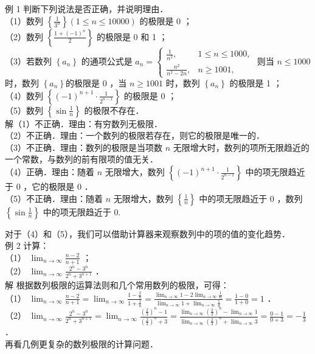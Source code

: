 \documentclass[10pt]{article}
\begin{document}
例 1 判断下列说法是否正确，并说明理由．\\
（1）数列 \(\left\{\frac{1}{3^{n}}\right\}(1 \leqslant n \leqslant 10000)\) 的极限是 0 ；\\
（2）数列 \(\left\{\frac{1+(-1)^{n}}{2}\right\}\) 的极限是 0 和 1 ；\\
（3）若数列 \(\left\{a_{n}\right\}\) 的通项公式是 \(a_{n}=\left\{\begin{array}{ll}\frac{1}{n^{2}}, & 1 \leqslant n \leqslant 1000, \\ \frac{n^{2}}{n^{2}-2 n}, & n \geqslant 1001,\end{array}\right.\) 则当 \(n \leqslant 1000\) 时，数列 \(\left\{a_{n}\right\}\)的极限是 0 ，当 \(n \geqslant 1001\) 时，数列 \(\left\{a_{n}\right\}\) 的极限是 1 ；\\
（4）数列 \(\left\{(-1)^{n+1} \cdot \frac{1}{2^{n-1}}\right\}\) 的极限是 0 ；\\
（5）数列 \(\left\{\sin \frac{1}{n}\right\}\) 的极限不存在．\\
解（1）不正确．理由：有穷数列无极限．\\
（2）不正确．理由：一个数列的极限若存在，则它的极限是唯一的．\\
（3）不正确．理由：数列的极限是当项数 \(n\) 无限增大时，数列的项所无限趋近的一个常数，与数列的前有限项的值无关．\\
（4）正确．理由：随着 \(n\) 无限增大，数列 \(\left\{(-1)^{n+1} \cdot \frac{1}{2^{n-1}}\right\}\) 中的项无限趋近于 0 ，它的极限是 0 ．\\
（5）不正确．理由：随着 \(n\) 无限增大，数列 \(\left\{\frac{1}{n}\right\}\) 中的项无限趋近于 0 ，数列 \(\left\{\sin \frac{1}{n}\right\}\) 中的项无限趋近于 0.

对于（4）和（5），我们可以借助计算器来观察数列中的项的值的变化趋势．\\
例 2 计算：\\
（1） \(\lim _{n \rightarrow \infty} \frac{n-2}{n+1}\) ；\\
（2） \(\lim _{n \rightarrow \infty} \frac{2^{n}-3^{n}}{2^{n}+3^{n+1}}\) ．\\
解 根据数列极限的运算法则和几个常用数列的极限，可得：\\
（1） \(\lim _{n \rightarrow \infty} \frac{n-2}{n+1}=\lim _{n \rightarrow \infty} \frac{1-\frac{2}{n}}{1+\frac{1}{n}}=\frac{\lim _{n \rightarrow \infty} 1-2 \lim _{n \rightarrow \infty} \frac{1}{n}}{\lim _{n \rightarrow \infty} 1+\lim _{n \rightarrow \infty} \frac{1}{n}}=\frac{1-0}{1+0}=1\) ．\\
（2） \(\lim _{n \rightarrow \infty} \frac{2^{n}-3^{n}}{2^{n}+3^{n+1}}=\lim _{n \rightarrow \infty} \frac{\left(\frac{2}{3}\right)^{n}-1}{\left(\frac{2}{3}\right)^{n}+3}=\frac{\lim _{n \rightarrow \infty}\left(\frac{2}{3}\right)^{n}-\lim _{n \rightarrow \infty} 1}{\lim _{n \rightarrow \infty}\left(\frac{2}{3}\right)^{n}+\lim _{n \rightarrow \infty} 3}=\frac{0-1}{0+3}=-\frac{1}{3}\) ．\\
再看几例更复杂的数列极限的计算问题．
\end{document}
